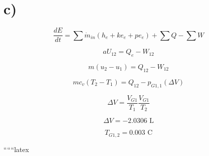 

\section*{c)}

\[
\frac{dE}{dt} = \sum \dot{m}_{in} (h_{e} + ke_{e} + pe_{e}) + \sum Q - \sum W
\]

\[
aU_{12} = Q_{e} - W_{12}
\]

\[
m (u_{2} - u_{1}) = Q_{12} - W_{12}
\]

\[
mc_{v} (T_{2} - T_{1}) = Q_{12} - p_{G1,1} (\Delta V)
\]

\[
\Delta V = \frac{V_{G1}}{T_{1}} \frac{V_{G1}}{T_{2}}
\]

\[
\boxed{\Delta V = -2.0306 \text{ L}}
\]

\[
\boxed{T_{G1,2} = 0.003 \text{ C}}
\]

``````latex